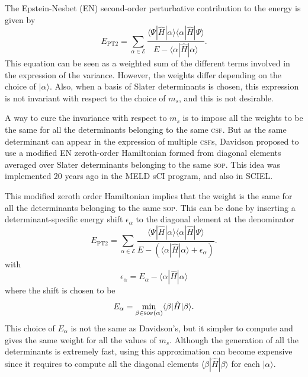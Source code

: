 \documentclass[aip,jcp,reprint,showkeys]{revtex4-1}
\newcommand{\ket}[1]{|#1\rangle}
\newcommand{\sop}{\textsc{sop}}
\newcommand{\csf}{\textsc{csf}}
\newcommand{\mel}[3]{\langle #1 | #2 | #3 \rangle}
\newcommand{\ept}{E_\text{PT2}}
\begin{document}
The Epstein-Nesbet (EN) second-order perturbative contribution to the energy is given
by
\begin{equation}
\ept = \sum_{\alpha \in \mathcal{E}} \frac{\mel{\Psi}{\hat{H}}{\alpha}\mel{\alpha}{\hat{H}}{\Psi}}{E-\mel{\alpha}{\hat{H}}{\alpha}}.
\label{eq:pt2}
\end{equation}
This equation can be seen as a weighted sum of the different terms involved in
the expression of the variance. However, the weights differ depending on the
choice of $\ket{\alpha}$. Also, when a basis of Slater determinants is chosen,
this expression is not invariant with respect to the choice of $m_s$, and this 
is not desirable.

A way to cure the invariance with respect to $m_s$ is to impose all the weights
to be the same for all the determinants belonging to the same \csf . But as 
the same determinant can appear in the expression of multiple \csf s, Davidson
proposed to use a modified EN zeroth-order Hamiltonian formed from
diagonal elements averaged over Slater determinants belonging to the same
\sop . This idea was implemented 20 years ago in the MELD sCI
program,\cite{Davidson_1979,Kozlowski_1994} and also in SCIEL.\cite{Sciel}

This modified zeroth order Hamiltonian implies that the weight is the same for
all the determinants belonging to the same \sop . This can be done by
inserting a determinant-specific energy shift $\epsilon_\alpha$ to the
diagonal element at the denominator 
\begin{equation}
\ept = \sum_{\alpha \in \mathcal{E}} \frac{\mel{\Psi}{\hat{H}}{\alpha}\mel{\alpha}{\hat{H}}{\Psi}}{E-\left(\mel{\alpha}{\hat{H}}{\alpha}+\epsilon_\alpha \right)}.
\end{equation}
with
\begin{equation}
\epsilon_\alpha = E_\alpha - \mel{\alpha}{\hat{H}}{\alpha} 
\end{equation}
where the shift is chosen to be
\begin{equation}
E_\alpha = \min_{\beta \in \text{\sop}(\alpha)} \mel{\beta}{\hat{H}}{\beta}.
\end{equation}
This choice of $E_\alpha$ is not the same as Davidson's, but it simpler to compute
and gives the same weight for all the values of $m_s$.
Although the generation of all the determinants is extremely fast, using
this approximation can become expensive since it requires to compute
all the diagonal elements $\mel{\beta}{\hat{H}}{\beta}$ for each
$\ket{\alpha}$.
\end{document}
